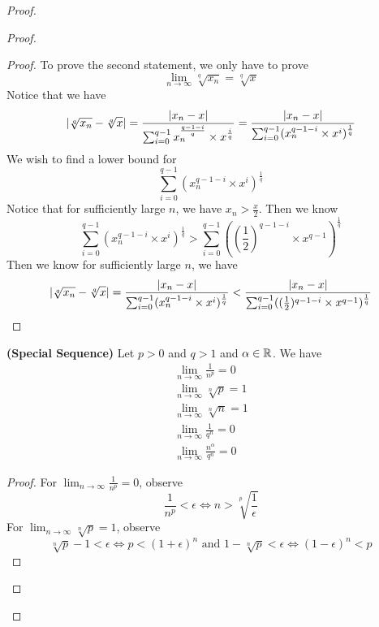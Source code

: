 \documentclass{report}
\begin{document}
\begin{proof}
\begin{proof}
\begin{proof}
To prove the second statement, we only have to prove
\begin{equation}
\lim_{n\to\infty} \sqrt[q]{x_n} =\sqrt[q]{x} 
\end{equation}
Notice that we have
\begin{equation}
|\sqrt[q]{x_n}-\sqrt[q]{x}|=\frac{|x_n-x|}{\sum_{i=0}^{q-1}x_n^{\frac{q-1-i}{q}}\times x^{\frac{i}{q}}}=\frac{|x_n-x|}{\sum_{i=0}^{q-1}(x_n^{q-1-i}\times x^i)^{\frac{1}{q}}}
\end{equation}
We wish to find a lower bound for 
\begin{equation}
\sum_{i=0}^{q-1}(x_n^{q-1-i}\times x^i)^{\frac{1}{q}}
\end{equation}
Notice that for sufficiently large $n$, we have $x_n>\frac{x}{2}$. Then we know
 \begin{equation}
\sum_{i=0}^{q-1}(x_n^{q-1-i}\times x^i)^{\frac{1}{q}}>\sum_{i=0}^{q-1}((\frac{1}{2})^{q-1-i}\times x^{q-1} )^{\frac{1}{q}}
\end{equation}
Then we know for sufficiently large $n$, we have
 \begin{equation}
|\sqrt[q]{x_n}-\sqrt[q]{x} |=\frac{|x_n-x|}{\sum_{i=0}^{q-1}(x_n^{q-1-i}\times x^i)^{\frac{1}{q}}}<\frac{|x_n-x|}{\sum_{i=0}^{q-1}((\frac{1}{2})^{q-1-i}\times x^{q-1})^{\frac{1}{q}}}
\end{equation}
\end{proof}
\begin{theorem}
\label{4.1.9}
\textbf{(Special Sequence)} Let $p>0$ and $q>1$ and $\alpha \in\mathbb{R}$. We have
\begin{gather}
\lim_{n\to\infty}\frac{1}{n^p}=0\\
\lim_{n\to\infty}\sqrt[n]{p}=1\\
\lim_{n\to\infty}\sqrt[n]{n}=1\\
\lim_{n\to\infty}\frac{1}{q^n}=0\\
\lim_{n\to\infty}\frac{n^{\alpha }}{q^n}=0
\end{gather}
\end{theorem}
\begin{proof}
For $\lim_{n\to\infty}\frac{1}{n^p}=0$, observe
\begin{equation}
\frac{1}{n^p}<\epsilon \iff n>\sqrt[p]{\frac{1}{\epsilon }}  
\end{equation}
For $\lim_{n\to\infty}\sqrt[n]{p}=1$, observe
\begin{equation}
\sqrt[n]{p}-1<\epsilon  \iff p<(1+\epsilon )^n\text{ and }1-\sqrt[n]{p}<\epsilon \iff (1-\epsilon )^n<p  
\end{equation}

\end{proof}
\end{proof}
\end{proof}
\end{document}
